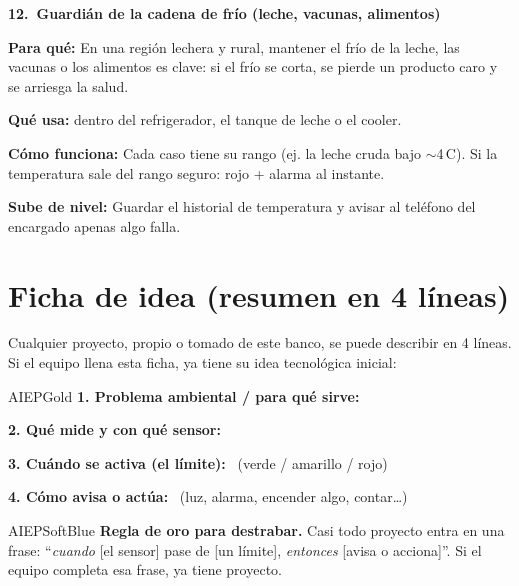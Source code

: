 \documentclass[11pt,letterpaper]{article}
\newcommand{\serig}[1]{%
  \tcbox[on line, colback=AIEPInk, colframe=AIEPInk, boxrule=0pt,
    arc=0.8mm, left=1.8mm, right=1.8mm, top=0.5mm, bottom=0.5mm]%
    {\small\bfseries\textcolor{white}{\texttt{#1}}}%
}
\newcommand{\nivel}[2]{%
  \tcbox[on line, colback=#1!14, colframe=#1, boxrule=0.6pt,
    arc=0.9mm, left=1.8mm, right=1.8mm, top=0.5mm, bottom=0.5mm]%
    {\footnotesize\bfseries\textcolor{#1}{#2}}%
}
\newcommand{\nbasico}{\nivel{AIEPGreen}{Fácil}}
\newcommand{\idea}[7]{%
\begin{ideabox}
{\large\bfseries\color{AIEPNavy}#1.\ #2}\hfill#3\par
\vspace{2.5mm}
{\color{AIEPSlate}\textbf{Para qué:}} #4\par\vspace{1.8mm}
{\color{AIEPSlate}\textbf{Qué usa:}} #5\par\vspace{1.8mm}
{\color{AIEPSlate}\textbf{Cómo funciona:}} #6\par\vspace{1.8mm}
{\color{AIEPGreen}\textbf{Sube de nivel:}} #7
\end{ideabox}%
}
\begin{document}
\idea{12}{Guardián de la cadena de frío (leche, vacunas, alimentos)}{\nbasico}%
{En una región lechera y rural, mantener el frío de la leche, las vacunas o los alimentos es clave:
si el frío se corta, se pierde un producto caro y se arriesga la salud.}%
{\serig{KY-001} dentro del refrigerador, el tanque de leche o el cooler.}%
{Cada caso tiene su rango (ej. la leche cruda bajo $\sim$4\,\textdegree C). Si la temperatura sale
del rango seguro: rojo + alarma al instante.}%
{Guardar el historial de temperatura y avisar al teléfono del encargado apenas algo falla.}

\section{Ficha de idea (resumen en 4 líneas)}
Cualquier proyecto, propio o tomado de este banco, se puede describir en 4 líneas. Si el equipo
llena esta ficha, ya tiene su idea tecnológica inicial:

\begin{infobox}{AIEPGold}
\textbf{1. Problema ambiental / para qué sirve:} \dotfill\par
\textbf{2. Qué mide y con qué sensor:} \dotfill\par
\textbf{3. Cuándo se activa (el límite):} \dotfill\ (verde / amarillo / rojo)\par
\textbf{4. Cómo avisa o actúa:} \dotfill\ (luz, alarma, encender algo, contar\ldots)
\end{infobox}

\begin{infobox}{AIEPSoftBlue}
\textbf{Regla de oro para destrabar.} Casi todo proyecto entra en una frase:
``\emph{cuando} [el sensor] pase de [un límite], \emph{entonces} [avisa o acciona]''.
Si el equipo completa esa frase, ya tiene proyecto.
\end{infobox}
\end{document}
